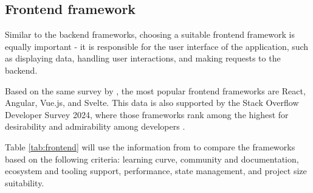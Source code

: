 \subsection{Frontend framework}
\label{sec:frontend}

Similar to the backend frameworks, choosing a suitable frontend framework is equally important - it is responsible for the user interface of the application, such as displaying data, handling user interactions, and making requests to the backend. 

Based on the same survey by \textcite{statista-webframeworks}, the most popular frontend frameworks are React, Angular, Vue.js, and Svelte. This data is also supported by the Stack Overflow Developer Survey 2024, where those frameworks rank among the highest for desirability and admirability among developers \parencite{stackoverflow}.

Table \ref{tab:frontend} will use the information from \textcite{react,angular,vue,svelte} to compare the frameworks based on the following criteria: learning curve, community and documentation, ecosystem and tooling support, performance, state management, and project size suitability.

\begin{table}[h]
    \centering
    \caption{Comparison of frontend frameworks}
    \label{tab:frontend}
\end{table}

